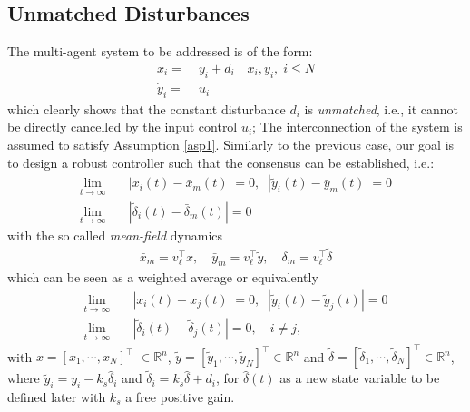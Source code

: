 \documentclass[journal,twoside]{IEEEtran}
\def\rea{\mathbb{R}}
\def\rea{\mathbb{R}}
\begin{document}
\subsection*{Unmatched Disturbances}
  
The multi-agent system to be addressed is of the form:
  \begin{align}
  \label{sys3}
  \dot  x_i =& \; y_i  + d_i \quad x_i, y_i,\;  i \leq N \nonumber \\
  \dot y_i=& \; u_i 
  \end{align}
which clearly shows that the constant disturbance $d_i$ is {\it unmatched}, i.e., it cannot be directly cancelled by the input control $u_i$; The interconnection of the system is assumed to satisfy Assumption \ref{asp1}.
Similarly to the previous case, our goal is to design a robust controller such that the consensus can be established, i.e.:
\begin{align}
 \label{goal3}
\lim_{t\to \infty} &\quad |x_{i}(t)-\bar x_{m}(t) |=0, \;\; |\tilde y_{i}(t)- \bar y_{m}(t) |  =0 \nonumber \\
\lim_{t\to \infty} &\quad |\tilde \delta_{i}(t)-\bar \delta_m(t) |=0 
\end{align}
 with the so called {\it mean-field} dynamics  \cite{PANLOR17}
 \begin{align}
 \label{mf1}
 \bar x_{m}= v_\ell^\top x, \quad \bar y_{m}= v_\ell^\top \tilde y, \quad \bar \delta_m=v_\ell^\top \tilde \delta
 \end{align}
  which can be seen as a weighted average or equivalently 
\begin{align}
\label{goal4}
\lim_{t\to \infty} &\quad |x_{i}(t)-x_{j}(t) |=0, \;\; |\tilde y_{i}(t)-\tilde y_{j}(t) |  =0 \nonumber \\
\lim_{t\to \infty} &\quad |\tilde \delta_{i}(t)-\tilde \delta_j(t) |=0, \quad i \not=j, 
\end{align}  
with  $x= [x_{1}, \cdots, x_{N}]^\top$ $\in \rea^n$,  $\tilde y= [\tilde y_{1},  \cdots, \tilde y_{N}]^\top \in \rea^n$ and $ \tilde \delta = [\tilde \delta_1, \cdots, \tilde \delta_N]^\top \in \rea^n$, where  $\tilde y_{i} = y_{i}- k_s \hat \delta_i$ and  $\tilde \delta_i=k_s  \hat \delta +d_i$, for $\hat \delta (t)$ as a new state variable to be defined later with $k_s$ a free positive gain.
\end{document}
